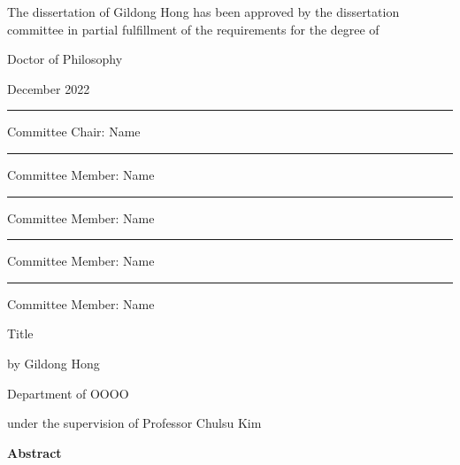 \documentclass[11pt]{report}
\begin{document}
\newpage
\begin{center}
\vspace{1cm}
{\fontsize{16pt}{18pt}\selectfont
The dissertation of Gildong Hong has been approved by the dissertation committee in partial fulfillment 
of the requirements for the degree of \par
Doctor of Philosophy \par}
\vspace{1cm}
{\fontsize{14pt}{14pt}\selectfont  December 2022 \par}  %
\vspace{2cm}
\rule{.6\textwidth}{0.4pt}\par %
{\fontsize{16pt}{16pt}\selectfont Committee Chair: Name \par}
\vspace{1cm}
\rule{.6\textwidth}{0.4pt}\par %
{\fontsize{16pt}{16pt}\selectfont Committee Member: Name \par}
\vspace{1cm}
\rule{.6\textwidth}{0.4pt}\par %
{\fontsize{16pt}{16pt}\selectfont Committee Member: Name \par}
\vspace{1cm}
\rule{.6\textwidth}{0.4pt}\par %
{\fontsize{16pt}{16pt}\selectfont Committee Member: Name \par}
\vspace{1cm}
\rule{.6\textwidth}{0.4pt}\par %
{\fontsize{16pt}{16pt}\selectfont Committee Member: Name \par}
\vspace{1cm}
\end{center}

\newpage 
{} %
\begin{center}
\LARGE Title %
\par\vspace{20pt}

\normalsize \doublespacing
by Gildong Hong\par %
Department of OOOO\par
under the supervision of Professor Chulsu Kim %
\par\vspace{20pt}
\large \textbf{Abstract}
\end{center}
\end{document}
